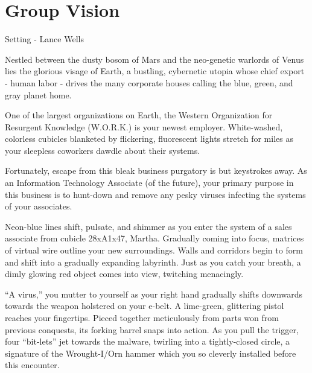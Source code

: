 \documentclass[12pt]{report}
\begin{document}
\chapter{Group Vision}


\begin{section}{Setting - Lance Wells}



Nestled between the dusty bosom of Mars and the neo-genetic warlords of Venus lies the 
glorious visage of Earth, a bustling, cybernetic utopia whose chief export - human labor 
- drives the many corporate houses calling the blue, green, and gray planet home.

One of the largest organizations on Earth, the Western Organization for Resurgent 
Knowledge (W.O.R.K.) is your newest employer. White-washed, colorless cubicles blanketed 
by flickering, fluorescent lights stretch for miles as your sleepless coworkers dawdle 
about their systems.

Fortunately, escape from this bleak business purgatory is but keystrokes away. As an 
Information Technology Associate (of the future), your primary purpose in this business 
is to hunt-down and remove any pesky viruses infecting the systems of your associates.

Neon-blue lines shift, pulsate, and shimmer as you enter the system of a sales associate 
from cubicle 28xA1x47, Martha. Gradually coming into focus, matrices of virtual wire 
outline your new surroundings. Walls and corridors begin to form and shift into a gradually 
expanding labyrinth. Just as you catch your breath, a dimly glowing red object comes into 
view, twitching menacingly.

``A virus,'' you mutter to yourself as your right hand gradually shifts downwards towards 
the weapon holstered on your e-belt. A lime-green, glittering pistol reaches your 
fingertips. Pieced together meticulously from parts won from previous conquests, its forking 
barrel snaps into action. As you pull the trigger, four ``bit-lets'' jet towards the malware, 
twirling into a tightly-closed circle, a signature of the Wrought-I/Orn hammer which you so 
cleverly installed before this encounter.


\end{section}
\end{document}
